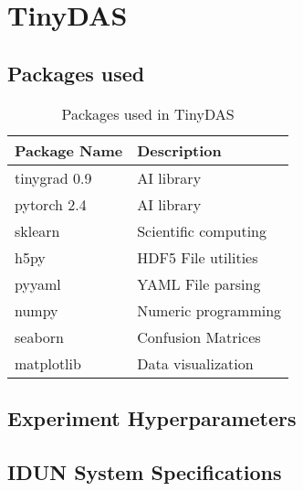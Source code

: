 \chapter{TinyDAS}
\label{app:tinydas-exp}

\section{Packages used}
\label{app:tinypacks}



\begin{table}[!htbp]
\centering
\caption{Packages used in TinyDAS}
\label{tab:tinydas-packages}
\small
\begin{tabular}{>{\raggedright\arraybackslash}p{}>{\raggedright\arraybackslash}p{}}
\toprule
\textbf{Package Name} & \textbf{Description} \\
\midrule
\rowcolor{gray!10} tinygrad 0.9 & AI library \\
pytorch 2.4 & AI library \\
\rowcolor{gray!10} sklearn & Scientific computing \\
h5py & HDF5 File utilities \\
\rowcolor{gray!10} pyyaml & YAML File parsing \\
numpy & Numeric programming \\
\rowcolor{gray!10} seaborn & Confusion Matrices \\
matplotlib & Data visualization \\
\bottomrule
\end{tabular}
\end{table}

\section{Experiment Hyperparameters}
\label{app:hyper}


%

\section{IDUN System Specifications}
\label{app:idun}


